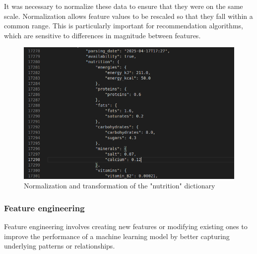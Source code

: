 It was necessary to normalize these data to ensure that they were on the same scale. Normalization allows feature values to be rescaled so that they fall within a common range. This is particularly important for recommendation algorithms, which are sensitive to differences in magnitude between features.
\begin{center}
\begin{figure}[H]
    \centering
    \includegraphics[scale=0.33]{images/transform_nutrition.png}
    \caption{Normalization and transformation of the "nutrition" dictionary} 
    \label{fig:Normalization_nutrition}
\end{figure}
\end{center}

\subsubsection{Feature engineering}
Feature engineering involves creating new features or modifying existing ones to improve the performance of a machine learning model by better capturing underlying patterns or relationships.

